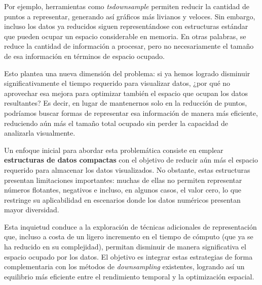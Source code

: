 Por ejemplo, herramientas como \textit{tsdownsample} permiten reducir la cantidad de puntos a representar, generando así gráficos más livianos y veloces. Sin embargo, incluso los datos ya reducidos siguen representándose con estructuras estándar que pueden ocupar un espacio considerable en memoria. En otras palabras, se reduce la cantidad de información a procesar, pero no necesariamente el tamaño de esa información en términos de espacio ocupado.

Esto plantea una nueva dimensión del problema: si ya hemos logrado disminuir significativamente el tiempo requerido para visualizar datos, ¿por qué no aprovechar esa mejora para optimizar también el espacio que ocupan los datos resultantes? Es decir, en lugar de mantenernos solo en la reducción de puntos, podríamos buscar formas de representar esa información de manera más eficiente, reduciendo aún más el tamaño total ocupado sin perder la capacidad de analizarla visualmente.

Un enfoque inicial para abordar esta problemática consiste en emplear \textbf{estructuras de datos compactas} con el objetivo de reducir aún más el espacio requerido para almacenar los datos visualizados. No obstante, estas estructuras presentan limitaciones importantes: muchas de ellas no permiten representar números flotantes, negativos e incluso, en algunos casos, el valor cero, lo que restringe su aplicabilidad en escenarios donde los datos numéricos presentan mayor diversidad.

Esta inquietud conduce a la exploración de técnicas adicionales de representación que, incluso a costa de un ligero incremento en el tiempo de cómputo (que ya se ha reducido en su complejidad), permitan disminuir de manera significativa el espacio ocupado por los datos. El objetivo es integrar estas estrategias de forma complementaria con los métodos de \textit{downsampling} existentes, logrando así un equilibrio más eficiente entre el rendimiento temporal y la optimización espacial.


